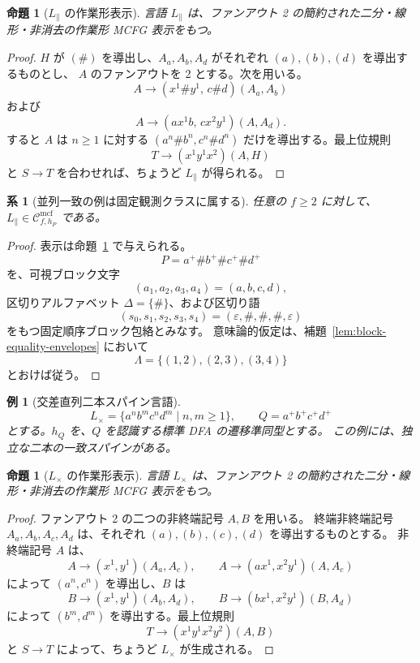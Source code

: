 \documentclass[11pt,a4paper]{ltjsarticle}
\newtheorem{proposition}[theorem]{命題}
\newtheorem{corollary}[theorem]{系}
\newtheorem{example}[theorem]{例}
\theoremstyle{remark}
\newcommand{\Cmcf}[2]{\mathcal{C}^{\mathrm{mcf}}_{#1,#2}}
\newcommand{\eps}{\varepsilon}
\begin{document}
\begin{proposition}[\(L_{\parallel}\) の作業形表示]
\label{prop:parallel-running-example}
言語 \(L_{\parallel}\) は、ファンアウト 2 の簡約された二分・線形・非消去の作業形 MCFG 表示をもつ。
\end{proposition}

\begin{proof}
\(H\) が \((\#)\) を導出し、\(A_a,A_b,A_d\) がそれぞれ \((a),(b),(d)\) を導出するものとし、
\(A\) のファンアウトを 2 とする。次を用いる。
\[
  A\to(x^1\#y^1,\,c\#d)(A_a,A_b)
\]
および
\[
  A\to(a x^1 b,\,c x^2 y^1)(A,A_d).
\]
すると \(A\) は \(n\ge1\) に対する
\((a^n\#b^n,c^n\#d^n)\) だけを導出する。最上位規則
\[
  T\to(x^1y^1x^2)(A,H)
\]
と \(S\to T\) を合わせれば、ちょうど \(L_{\parallel}\) が得られる。
\end{proof}

\begin{corollary}[並列一致の例は固定観測クラスに属する]
\label{cor:parallel-in-fixed-observation-class}
任意の \(f\ge2\) に対して、\(L_{\parallel}\in\Cmcf{f}{h_P}\) である。
\end{corollary}

\begin{proof}
表示は命題~\ref{prop:parallel-running-example} で与えられる。
\[
  P=a^+\#b^+\#c^+\#d^+
\]
を、可視ブロック文字
\[
  (a_1,a_2,a_3,a_4)=(a,b,c,d),
\]
区切りアルファベット \(\Delta=\{\#\}\)、および区切り語
\[
  (s_0,s_1,s_2,s_3,s_4)=(\eps,\#,\#,\#,\eps)
\]
をもつ固定順序ブロック包絡とみなす。
意味論的仮定は、補題~\ref{lem:block-equality-envelopes} において
\[
  \Lambda=\{(1,2),(2,3),(3,4)\}
\]
とおけば従う。
\end{proof}

\begin{example}[交差直列二本スパイン言語]
\label{ex:cross-serial-language}
\[
  L_{\times}=\{a^n b^m c^n d^m\mid n,m\ge1\},
  \qquad Q=a^+b^+c^+d^+
\]
とする。\(h_Q\) を、\(Q\) を認識する標準 DFA の遷移準同型とする。
この例には、独立な二本の一致スパインがある。
\end{example}

\begin{proposition}[\(L_{\times}\) の作業形表示]
\label{prop:cross-serial-running-example}
言語 \(L_{\times}\) は、ファンアウト 2 の簡約された二分・線形・非消去の作業形 MCFG 表示をもつ。
\end{proposition}

\begin{proof}
ファンアウト 2 の二つの非終端記号 \(A,B\) を用いる。
終端非終端記号 \(A_a,A_b,A_c,A_d\) は、それぞれ \((a),(b),(c),(d)\) を導出するものとする。
非終端記号 \(A\) は、
\[
  A\to(x^1,y^1)(A_a,A_c),
  \qquad
  A\to(a x^1,x^2 y^1)(A,A_c)
\]
によって \((a^n,c^n)\) を導出し、\(B\) は
\[
  B\to(x^1,y^1)(A_b,A_d),
  \qquad
  B\to(b x^1,x^2 y^1)(B,A_d)
\]
によって \((b^m,d^m)\) を導出する。最上位規則
\[
  T\to(x^1y^1x^2y^2)(A,B)
\]
と \(S\to T\) によって、ちょうど \(L_{\times}\) が生成される。
\end{proof}
\end{document}
